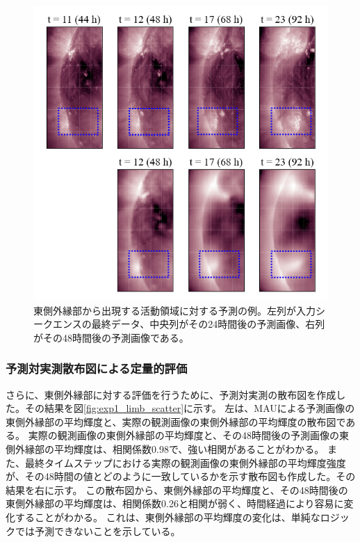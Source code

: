         \begin{figure}[htbp]
          \centering
          \includegraphics[width=\textwidth]{figures/exp1/limb_sample_12_caption.jpg}
          \caption{東側外縁部から出現する活動領域に対する予測の例。左列が入力シークエンスの最終データ、中央列がその24時間後の予測画像、右列がその48時間後の予測画像である。}
          \label{fig:exp1_limb_example_2}
        \end{figure}

      \subsubsection{予測対実測散布図による定量的評価}
        さらに、東側外縁部に対する評価を行うために、予測対実測の散布図を作成した。その結果を図\ref{fig:exp1_limb_scatter}に示す。
        左は、MAUによる予測画像の東側外縁部の平均輝度と、実際の観測画像の東側外縁部の平均輝度の散布図である。
        実際の観測画像の東側外縁部の平均輝度と、その48時間後の予測画像の東側外縁部の平均輝度は、相関係数0.98で、強い相関があることがわかる。
        また、最終タイムステップにおける実際の観測画像の東側外縁部の平均輝度強度が、その48時間の値とどのように一致しているかを示す散布図も作成した。その結果を右に示す。
        この散布図から、東側外縁部の平均輝度と、その48時間後の東側外縁部の平均輝度は、相関係数0.26と相関が弱く、時間経過により容易に変化することがわかる。
        これは、東側外縁部の平均輝度の変化は、単純なロジックでは予測できないことを示している。
        
